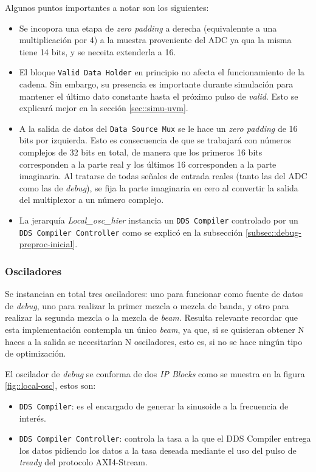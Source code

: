 \documentclass[../../main.tex]{subfiles}
\begin{document}
Algunos puntos importantes a notar son los siguientes:
\begin{itemize}
    \item Se incopora una etapa de \textit{zero padding} a derecha (equivalennte a una multiplicación por 4) a la muestra proveniente del ADC ya qua la misma tiene 14 bits, y se neceita extenderla a 16.
    \item El bloque \texttt{Valid Data Holder} en principio no afecta el funcionamiento de la cadena. Sin embargo, su presencia es importante durante simulación para mantener el último dato constante hasta el próximo pulso de \textit{valid}. Esto se explicará mejor en la sección \ref{sec::simu-uvm}.
    \item A la salida de datos del \texttt{Data Source Mux} se le hace un \textit{zero padding} de 16 bits por izquierda. Esto es consecuencia de que se trabajará con números complejos de 32 bits en total, de manera que los primeros 16 bits corresponden a la parte real y los últimos 16 corresponden a la parte imaginaria. Al tratarse de todas señales de entrada reales (tanto las del ADC como las de \textit{debug}), se fija la parte imaginaria en cero al convertir la salida del multiplexor a un número complejo.
    \item La jerarquía \textit{Local\_osc\_hier} instancia un \texttt{DDS Compiler} controlado por un \texttt{DDS Compiler Controller} como se explicó en la subsección \ref{subsec::debug-preproc-inicial}.
\end{itemize}


\subsubsection{Osciladores}
Se instancian en total tres osciladores: uno para funcionar como fuente de datos de \textit{debug}, uno para realizar la primer mezcla o mezcla de banda, y otro para realizar la segunda mezcla o la mezcla de \textit{beam}. Resulta relevante recordar que esta implementación contempla un único \textit{beam}, ya que, si se quisieran obtener N haces a la salida se necesitarían N osciladores, esto es, si no se hace ningún tipo de optimización.

El oscilador de \textit{debug} se conforma de dos \textit{IP Blocks} como se muestra en la figura \ref{fig::local-osc}, estos son:
\begin{itemize}
    \item \texttt{DDS Compiler}: es el encargado de generar la sinusoide a la frecuencia de interés.
    \item \texttt{DDS Compiler Controller}: controla la tasa a la que el DDS Compiler entrega los datos pidiendo los datos a la tasa deseada mediante el uso del pulso de \textit{tready} del protocolo AXI4-Stream.
\end{itemize}
\end{document}
